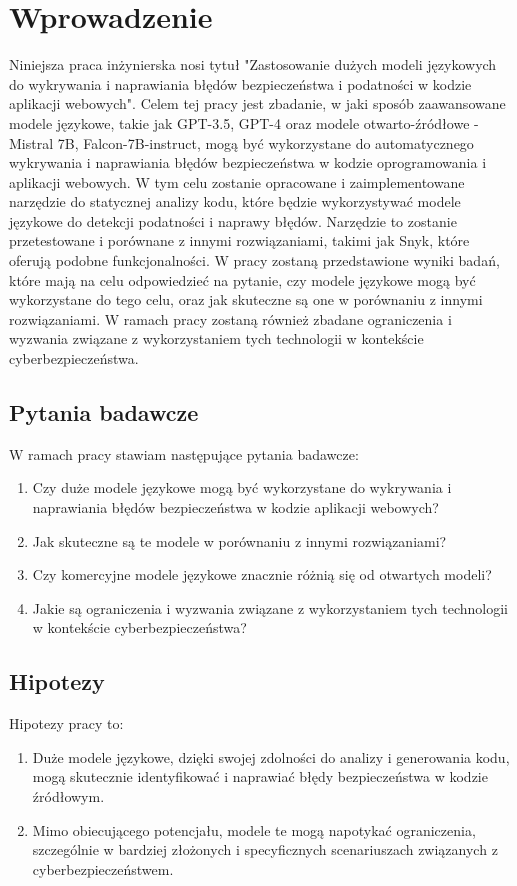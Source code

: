 
\chapter*{Wprowadzenie}

Niniejsza praca inżynierska nosi tytuł "Zastosowanie dużych modeli językowych do wykrywania i naprawiania błędów bezpieczeństwa i podatności w kodzie aplikacji webowych". Celem tej pracy jest zbadanie, w jaki sposób zaawansowane modele językowe, takie jak GPT-3.5, GPT-4 oraz modele otwarto-źródłowe - Mistral 7B, Falcon-7B-instruct, mogą być wykorzystane do automatycznego wykrywania i naprawiania błędów bezpieczeństwa w kodzie oprogramowania i aplikacji webowych. 
W tym celu zostanie opracowane i zaimplementowane narzędzie do statycznej analizy kodu, które będzie wykorzystywać modele językowe do detekcji podatności i naprawy błędów.
Narzędzie to zostanie przetestowane i porównane z innymi rozwiązaniami, takimi jak Snyk, które oferują podobne funkcjonalności.
W pracy zostaną przedstawione wyniki badań, które mają na celu odpowiedzieć na pytanie, czy modele językowe mogą być wykorzystane do tego celu, oraz jak skuteczne są one w porównaniu z innymi rozwiązaniami.
W ramach pracy zostaną również zbadane ograniczenia i wyzwania związane z wykorzystaniem tych technologii w kontekście cyberbezpieczeństwa.

\section*{Pytania badawcze}
W ramach pracy stawiam następujące pytania badawcze:
\begin{enumerate}
    \item Czy duże modele językowe mogą być wykorzystane do wykrywania i naprawiania błędów bezpieczeństwa w kodzie aplikacji webowych?
    \item Jak skuteczne są te modele w porównaniu z innymi rozwiązaniami?
    \item Czy komercyjne modele językowe znacznie różnią się od otwartych modeli?
    \item Jakie są ograniczenia i wyzwania związane z wykorzystaniem tych technologii w kontekście cyberbezpieczeństwa?
\end{enumerate}

\section*{Hipotezy}
Hipotezy pracy to:
\begin{enumerate}
    \item Duże modele językowe, dzięki swojej zdolności do analizy i generowania kodu, mogą skutecznie identyfikować i naprawiać błędy bezpieczeństwa w kodzie źródłowym.
    \item Mimo obiecującego potencjału, modele te mogą napotykać ograniczenia, szczególnie w bardziej złożonych i specyficznych scenariuszach związanych z cyberbezpieczeństwem.
\end{enumerate}

